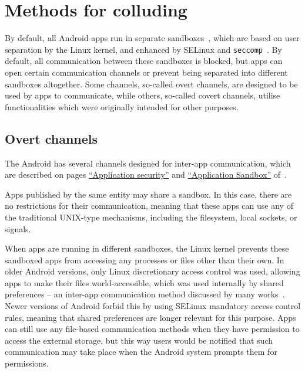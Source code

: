 \documentclass[article]{aaltoseries}
\newcommand{\sref}[1]{section~\ref{#1}}
\renewcommand\gls\cgls
\begin{document}
\section{Methods for colluding}
\label{sec:methods}

By default, all Android apps run in separate sandboxes~\cite[\href{https://source.android.com/security/overview/app-security}{``Application security''}]{AOSPsecurity}, which are based on user separation by the Linux kernel, and enhanced by SELinux and \texttt{seccomp}~\cite[\href{https://source.android.com/security/app-sandbox}{``Application Sandbox''}]{AOSPsecurity}. By default, all communication between these sandboxes is blocked, but apps can open certain communication channels or prevent being separated into different sandboxes altogether. Some channels, so-called overt channels, are designed to be used by apps to communicate, while others, so-called covert channels, utilise functionalities which were originally intended for other purposes.

\subsection{Overt channels}
\label{sec:overt}

The Android \gls{os} has several channels designed for inter-app communication, which are described on pages \href{https://source.android.com/security/overview/app-security}{``Application security''} and \href{https://source.android.com/security/app-sandbox}{``Application Sandbox''} of~\cite{AOSPsecurity}.

Apps published by the same entity may share a sandbox. In this case, there are no restrictions for their communication, meaning that these apps can use any of the traditional UNIX-type mechanisms, including the filesystem, local sockets, or signals.

When apps are running in different sandboxes, the Linux kernel prevents these sandboxed apps from accessing any processes or files other than their own. In older Android versions, only Linux discretionary access control was used, allowing apps to make their files world-accessible, which was used internally by shared preferences -- an inter-app communication method discussed by many works~\cite{Bhandari2017, Asavoae2017}. Newer versions of Android forbid this by using SELinux mandatory access control rules, meaning that shared preferences are longer relevant for this purpose. Apps can still use any file-based communication methods when they have permission to access the external storage, but this way users would be notified that such communication may take place when the Android system prompts them for permissions.
\end{document}
